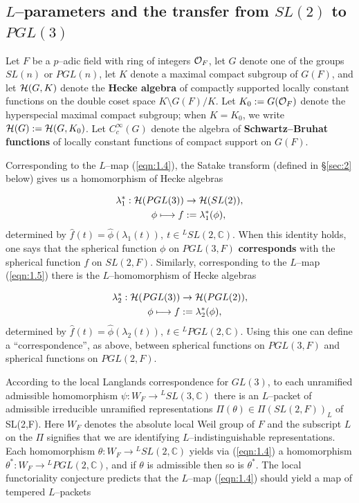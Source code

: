 \documentclass[12pt,letterpaper]{article}
\def\hhh{{\cal H}}
\def\ccc{\mathbb{C}}
\def\off{{\cal O}_F}
\begin{document}
\subsection{$L$--parameters and the transfer from $SL(2)$ to $PGL(3)$}
\label{sec:1.2}

Let $F$ be a $p$--adic field with ring of integers $\off$, let $G$
denote one of the groups $SL(n)$ or $PGL(n)$, let $K$ denote
a maximal compact subgroup of $G(F)$, and let $\hhh (G,K)$
denote the {\bf Hecke algebra} of compactly
supported locally constant functions on the double coset space
$K\setminus G(F)/K$. Let $K_0:= G(\off )$ denote the hyperspecial
maximal compact subgroup; when $K = K_0$, we write $\hhh (G) := 
\hhh (G,K_0)$. Let $C^\infty_c(G)$ denote the algebra of 
{\bf Schwartz--Bruhat functions} of locally constant functions of
compact support on $G(F)$. 
 
Corresponding to the $L$--map (\ref{eqn:1.4}), the Satake transform (defined 
in \S \ref{sec:2} below) gives us a homomorphism of Hecke algebras

\begin{equation}
\label{eqn:1.6}
\begin{split}
&\lambda_1^* : \hhh (PGL(3)) \rightarrow \hhh (SL(2)),\\
&\ \ \ \ \ \ \ \ \ \ \ \phi \longmapsto f :=\lambda_1^*(\phi),
\end{split}
\end{equation}
determined by 
$\hat{f}(t) = \hat{\phi }(\lambda_1 (t)),\ t \in {^{L}SL(2,\ccc )}$.
When this identity holds, one says that the spherical function $\phi $
on $PGL(3,F)$ {\bf corresponds} with the spherical function $f$ on $SL(2,F)$.
Similarly, corresponding to the $L$--map (\ref{eqn:1.5})
there is the $L$--homomorphism of Hecke algebras

\begin{equation}
\label{eqn:1.7}
\begin{split}
&\lambda_2^* : \hhh (PGL(3)) \rightarrow \hhh (PGL(2)),\\
&\ \ \ \ \ \ \ \ \ \ \ \phi \longmapsto f := \lambda_2^*(\phi),
\end{split}
\end{equation}
determined by $\hat{f}(t) = \hat{\phi }(\lambda_2 (t)),\ t \in 
{^{L}PGL(2,\ccc )}$. Using this one can define a ``correspondence'', as above,
between spherical functions on $PGL(3,F)$ and spherical functions on
$PGL(2,F)$. 
 
According to the local Langlands correspondence for $GL(3)$, to each
unramified admissible homomorphism
$\psi :W_F \rightarrow {^{L}SL(3,\ccc )}$ there is an $L$--packet of
admissible irreducible 
unramified representations $\Pi (\theta )  \in
\Pi (SL(2,F))_L$ of SL(2,F). Here $W_F$ denotes the 
absolute local Weil group of $F$ and the subscript $L$ on the $\Pi$ signifies
that we are identifying $L$--indistinguishable representations. 
Each homomorphism
$\theta : W_F \rightarrow {^{L}SL(2,\ccc )}$ yields via (\ref{eqn:1.4})
a homomorphism $\theta^* : W_F \rightarrow {^{L}PGL(2,\ccc )}$, and if 
$\theta$ is
admissible then so is $\theta^*$. The local functoriality conjecture
predicts that the $L$--map (\ref{eqn:1.4}) 
should yield a map of tempered $L$--packets
\end{document}
